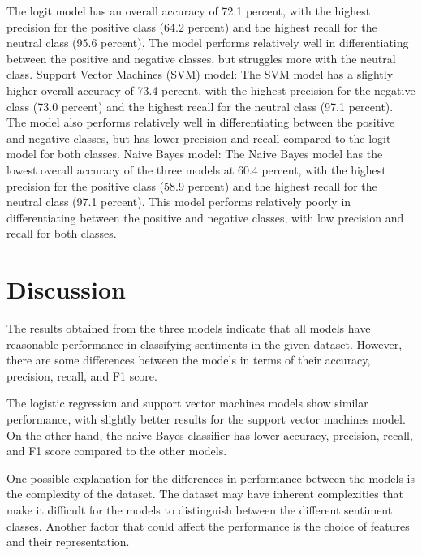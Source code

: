 \documentclass{article}
\begin{document}
%
The logit model has an overall accuracy of 72.1 percent, with the highest precision for the positive class (64.2 percent) and the highest recall for the neutral class (95.6 percent). The model performs relatively well in differentiating between the positive and negative classes, but struggles more with the neutral class.
%
Support Vector Machines (SVM) model: The SVM model has a slightly higher overall accuracy of 73.4 percent, with the highest precision for the negative class (73.0 percent) and the highest recall for the neutral class (97.1 percent). The model also performs relatively well in differentiating between the positive and negative classes, but has lower precision and recall compared to the logit model for both classes.
%
Naive Bayes model: The Naive Bayes model has the lowest overall accuracy of the three models at 60.4 percent, with the highest precision for the positive class (58.9 percent) and the highest recall for the neutral class (97.1 percent). This model performs relatively poorly in differentiating between the positive and negative classes, with low precision and recall for both classes.



\section{Discussion}
The results obtained from the three models indicate that all models have reasonable performance in classifying sentiments in the given dataset. However, there are some differences between the models in terms of their accuracy, precision, recall, and F1 score.

The logistic regression and support vector machines models show similar performance, with slightly better results for the support vector machines model. On the other hand, the naive Bayes classifier has lower accuracy, precision, recall, and F1 score compared to the other models.

One possible explanation for the differences in performance between the models is the complexity of the dataset. The dataset may have inherent complexities that make it difficult for the models to distinguish between the different sentiment classes. Another factor that could affect the performance is the choice of features and their representation.
\end{document}

